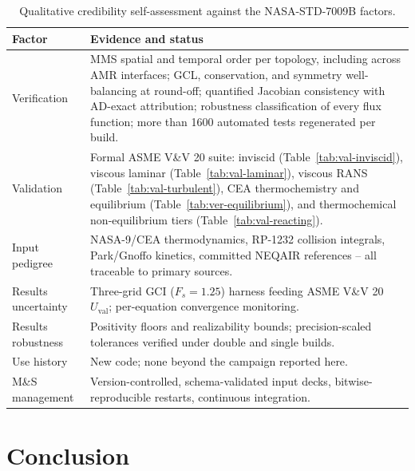 \documentclass[journal,biblatex]{new-aiaa}
\begin{document}
\begin{table}[t]
\centering\footnotesize\setlength{\tabcolsep}{5pt}
\caption{Qualitative credibility self-assessment against the NASA-STD-7009B
factors.}
\label{tab:credibility}
\begin{tabular}{@{}lp{10.5cm}@{}}
\toprule
Factor & Evidence and status \\
\midrule
Verification & MMS spatial and temporal order per topology, including across AMR interfaces; GCL, conservation, and symmetry well-balancing at round-off; quantified Jacobian consistency with AD-exact attribution; robustness classification of every flux function; more than 1600 automated tests regenerated per build. \\
Validation & Formal ASME V\&V 20 suite: inviscid (Table~\ref{tab:val-inviscid}), viscous laminar (Table~\ref{tab:val-laminar}), viscous RANS (Table~\ref{tab:val-turbulent}), CEA thermochemistry and equilibrium (Table~\ref{tab:ver-equilibrium}), and thermochemical non-equilibrium tiers (Table~\ref{tab:val-reacting}). \\
Input pedigree & NASA-9/CEA thermodynamics, RP-1232 collision integrals, Park/Gnoffo kinetics, committed NEQAIR references -- all traceable to primary sources. \\
Results uncertainty & Three-grid GCI ($F_s{=}1.25$) harness feeding ASME V\&V 20 $U_{\mathrm{val}}$; per-equation convergence monitoring. \\
Results robustness & Positivity floors and realizability bounds; precision-scaled tolerances verified under double and single builds. \\
Use history & New code; none beyond the campaign reported here. \\
M\&S management & Version-controlled, schema-validated input decks, bitwise-reproducible restarts, continuous integration. \\
\bottomrule
\end{tabular}
\end{table}

\section{Conclusion}
\end{document}
